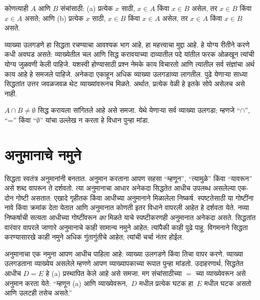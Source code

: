 \begin{prop}
कोणत्याही $A$ आणि $B$ संचांसाठी: (a) प्रत्येक $x$ साठी, $x \in A$ किंवा $x \in B$ असेल, तर $x \in B$ किंवा $x \in A$ असते; आणि (b) प्रत्येक $x$ साठी, $x \in B$ किंवा $x \in A$ असेल, तर $x \in A$ किंवा $x \in B$ असते.
\end{prop}

व्याख्या उलगडणे हा सिद्धता रचण्याचा आवश्यक भाग आहे, हा महत्त्वाचा मुद्दा आहे. हे योग्य रीतीने करणे कधी अवघड असते: व्याख्येतील चल आणि सिद्ध करावयाच्या दाव्यातील पदे यांतील फरक ओळखून त्यांची योग्य जुळवणी केली पाहिजे. यशस्वी होण्यासाठी प्रश्न नेमके काय विचारतो आणि त्यातील सर्व संज्ञांचा अर्थ काय आहे हे समजले पाहिजे. अनेकदा एकाहून अधिक व्याख्या उलगडाव्या लागतील. पुढे येणाऱ्या साध्या सिद्धतांत उत्तर जवळजवळ थेट व्याख्यांवरूनच मिळते. अर्थात, प्रत्येक वेळी हे इतके सोपे असेलच असे नाही.

\begin{prob}
$A \cap B \neq \emptyset$ सिद्ध करायला सांगितले आहे असे समजा. येथे येणाऱ्या सर्व व्याख्या उलगडा; म्हणजे “$\cap$”, “=” किंवा “$\emptyset$” यांचा उल्लेख न करता हे विधान पुन्हा मांडा.
\end{prob}












\section{अनुमानाचे नमुने}\label{mth:prf:pat:sec}

सिद्धता स्वतंत्र अनुमानांनी बनतात. अनुमान करताना आपण सहसा “म्हणून”, “त्यामुळे” किंवा “यावरून” असे शब्द वापरून ते दर्शवतो. त्या अनुमानाचा आधार अनेकदा सिद्धतेत आधीच उपलब्ध असलेल्या एक-दोन गोष्टी असतात: एखादे गृहीतक किंवा आधीच्या अनुमानाने मिळालेला निष्कर्ष. स्पष्टतेसाठी या गोष्टींना नावे किंवा क्रमांक देता येतात आणि अनुमानात कोणती इतर विधाने वापरली आहेत हे दर्शवता येते. नव्या निष्कर्षाची सत्यता आधीच्या गोष्टींवरून \emph{का} मिळते याचे स्पष्टीकरणही अनुमानात अनेकदा असते. सिद्धतांत वारंवार वापरले जाणारे अनुमानाचे काही सामान्य नमुने आहेत; त्यांपैकी काही पुढे पाहू. विगमनाने सिद्धता करण्यासारखे काही नमुने अधिक गुंतागुंतीचे आहेत; त्यांची चर्चा नंतर होईल.

अनुमानाचा एक नमुना आपण आधीच पाहिला आहे: व्याख्या उलगडणे किंवा तिचा वापर करणे. व्याख्या उलगडताना व्याख्येय असलेले म्हणणे आपण व्याख्यापकाच्या रूपात पुन्हा मांडतो. उदाहरणार्थ, सिद्धतेत आधीच $D = E$ हे (a) प्रस्थापित केले आहे असे समजा. मग संचांसाठीच्या $=$ च्या व्याख्येवरून असे अनुमान करता येते: “म्हणून (a) आणि व्याख्येवरून,~$D$ मधील प्रत्येक घटक हा~$E$ मधील घटक असतो आणि उलटही तसेच असते.”

